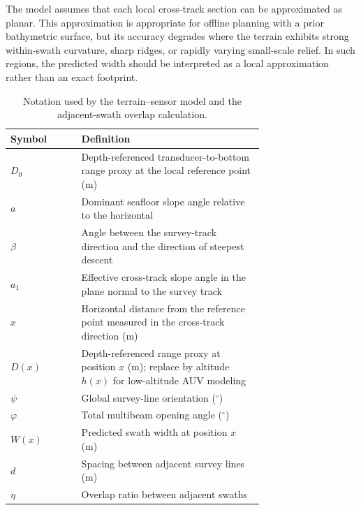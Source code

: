 \documentclass[jmse,article,submit,moreauthors]{Definitions/mdpi}
\begin{document}
The model assumes that each local cross-track section can be approximated as planar. This approximation is appropriate for offline planning with a prior bathymetric surface, but its accuracy degrades where the terrain exhibits strong within-swath curvature, sharp ridges, or rapidly varying small-scale relief. In such regions, the predicted width should be interpreted as a local approximation rather than an exact footprint.

\begin{table}[!htbp]
	\centering
	\caption{Notation used by the terrain--sensor model and the adjacent-swath overlap calculation.}
	\label{tab:table1}
	\footnotesize
	\renewcommand{\arraystretch}{1.15}
	\begin{tabular}{lp{0.72\linewidth}}
		\toprule
		\textbf{Symbol} & \textbf{Definition} \\
		\midrule
		$D_0$ & Depth-referenced transducer-to-bottom range proxy at the local reference point (m) \\
		$a$ & Dominant seafloor slope angle relative to the horizontal \\
		$\beta$ & Angle between the survey-track direction and the direction of steepest descent \\
		$a_1$ & Effective cross-track slope angle in the plane normal to the survey track \\
		$x$ & Horizontal distance from the reference point measured in the cross-track direction (m) \\
		$D(x)$ & Depth-referenced range proxy at position $x$ (m); replace by altitude \(h(x)\) for low-altitude AUV modeling \\
		$\psi$ & Global survey-line orientation ($^\circ$) \\
		$\varphi$ & Total multibeam opening angle ($^\circ$) \\
		$W(x)$ & Predicted swath width at position $x$ (m) \\
		$d$ & Spacing between adjacent survey lines (m) \\
		$\eta$ & Overlap ratio between adjacent swaths \\
		\bottomrule
	\end{tabular}
\end{table}
\end{document}
